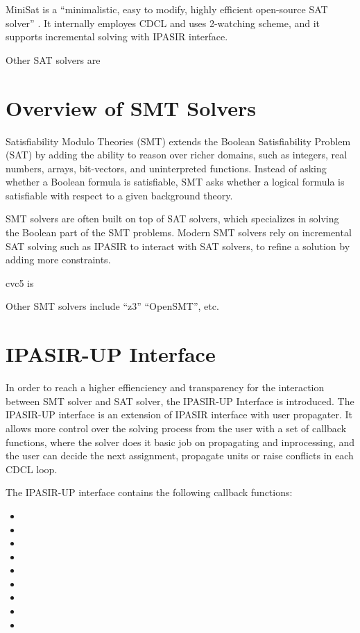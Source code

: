MiniSat is a ``minimalistic, easy to modify, highly efficient open-source SAT solver'' . It internally employes CDCL and uses 2-watching scheme, and it supports incremental solving with IPASIR interface.

Other SAT solvers are 

\section{Overview of SMT Solvers}

Satisfiability Modulo Theories (SMT) extends the Boolean Satisfiability Problem (SAT) by adding the ability to reason over richer domains, such as integers, real numbers, arrays, bit-vectors, and uninterpreted functions. Instead of asking whether a Boolean formula is satisfiable, SMT asks whether a logical formula is satisfiable with respect to a given background theory.

SMT solvers are often built on top of SAT solvers, which specializes in solving the Boolean part of the SMT problems. Modern SMT solvers rely on incremental SAT solving such as IPASIR to interact with SAT solvers, to refine a solution by adding more constraints.

cvc5 is 

Other SMT solvers include ``z3'' ``OpenSMT'', etc.

\section{IPASIR-UP Interface}

In order to reach a higher effienciency and transparency for the interaction between SMT solver and SAT solver, the IPASIR-UP Interface is introduced. The IPASIR-UP interface is an extension of IPASIR interface with user propagater.  It allows more control over the solving process from the user with a set of callback functions, where the solver does it basic job on propagating and inprocessing, and the user can decide the next assignment, propagate units or raise conflicts in each CDCL loop.

The IPASIR-UP interface contains the following callback functions:

\begin{itemize}
\item {}
\item {}
\item {}
\item {}
\item {}
\item {}
\item {}
\item {}
\item {}
\end{itemize}

